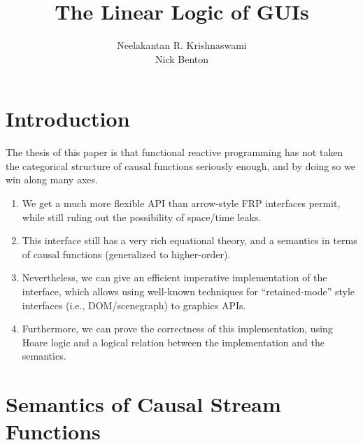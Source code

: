 \documentclass{article}
\title{The Linear Logic of GUIs}
\author{Neelakantan R. Krishnaswami \\ Nick Benton}
\begin{document}
\section{Introduction}

The thesis of this paper is that functional reactive programming has not taken the 
categorical structure of causal functions seriously enough, and by doing so we win 
along many axes. 

\begin{enumerate}
\item We get a much more flexible API than arrow-style FRP interfaces
  permit, while still ruling out the possibility of space/time leaks.

\item This interface still has a very rich equational theory, and a
  semantics in terms of causal functions (generalized to higher-order). 

\item Nevertheless, we can give an efficient imperative implementation of the 
  interface, which allows using well-known techniques for ``retained-mode''
  style interfaces (i.e., DOM/scenegraph) to graphics APIs.  

\item Furthermore, we can prove the correctness of this implementation, using
  Hoare logic and a logical relation between the implementation and the semantics. 
\end{enumerate}

\section{Semantics of Causal Stream Functions}
\end{document}
